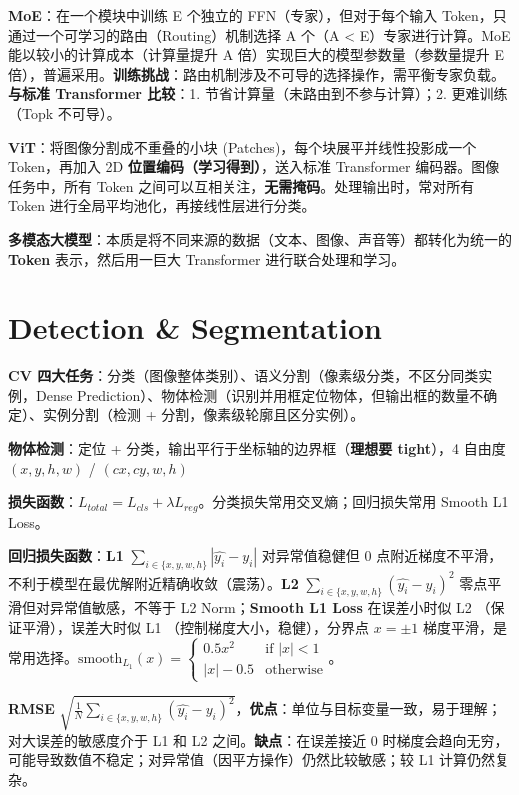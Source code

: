 \documentclass[
  8pt]{extarticle}
\begin{document}
\begin{multicols*}{4}
\textbf{MoE}：在一个模块中训练 E 个独立的 FFN（专家），但对于每个输入
Token，只通过一个可学习的路由（Routing）机制选择 A 个（A \textless{}
E）专家进行计算。MoE 能以较小的计算成本（计算量提升 A
倍）实现巨大的模型参数量（参数量提升 E
倍），普遍采用。\textbf{训练挑战}：路由机制涉及不可导的选择操作，需平衡专家负载。\textbf{与标准
Transformer 比较}：1. 节省计算量（未路由到不参与计算）；2.
更难训练（Topk 不可导）。

\textbf{ViT}：将图像分割成不重叠的小块
(Patches)，每个块展平并线性投影成一个 Token，再加入 2D
\textbf{位置编码（学习得到）}，送入标准 Transformer
编码器。图像任务中，所有 Token
之间可以互相关注，\textbf{无需掩码}。处理输出时，常对所有 Token
进行全局平均池化，再接线性层进行分类。

\textbf{多模态大模型}：本质是将不同来源的数据（文本、图像、声音等）都转化为统一的
\textbf{Token} 表示，然后用一巨大 Transformer 进行联合处理和学习。

\hypertarget{detection-segmentation}{%
\section{Detection \& Segmentation}\label{detection-segmentation}}

\textbf{CV
四大任务}：分类（图像整体类别）、语义分割（像素级分类，不区分同类实例，Dense
Prediction）、物体检测（识别并用框定位物体，但输出框的数量不确定）、实例分割（检测
+ 分割，像素级轮廓且区分实例）。

\textbf{物体检测}：定位 + 分类，输出平行于坐标轴的边界框（\textbf{理想要
tight}），4 自由度 \((x, y, h, w)\) / \((cx, cy, w, h)\)

\textbf{损失函数}：\(L_{total} = L_{cls} + \lambda L_{reg}\)。分类损失常用交叉熵；回归损失常用
Smooth L1 Loss。

\textbf{回归损失函数}：\textbf{L1}
\(\sum_{i \in \{x,y,w,h\}} |\hat{y_i} - y_i|\) 对异常值稳健但 0
点附近梯度不平滑，不利于模型在最优解附近精确收敛（震荡）。\textbf{L2}
\(\sum_{i \in \{x,y,w,h\}} (\hat{y_i} - y_i)^2\)
零点平滑但对异常值敏感，不等于 L2 Norm；\textbf{Smooth L1 Loss}
在误差小时似 L2 （保证平滑），误差大时似 L1
（控制梯度大小，稳健），分界点 \(x=\pm1\)
梯度平滑，是常用选择。\(\text {smooth}_{L_1}(x) = \begin{cases} 0.5x^2 & \text{if } |x| < 1 \\ |x| - 0.5 & \text{otherwise} \end {cases}\)。

\textbf{RMSE}
\(\sqrt {\frac {1}{N} \sum_{i \in \{x,y,w,h\}} (\hat {y_i} - y_i)^2}\)，\textbf{优点}：单位与目标变量一致，易于理解；对大误差的敏感度介于
L1 和 L2 之间。\textbf{缺点}：在误差接近 0
时梯度会趋向无穷，可能导致数值不稳定；对异常值（因平方操作）仍然比较敏感；较
L1 计算仍然复杂。


\end{multicols*}
\end{document}
